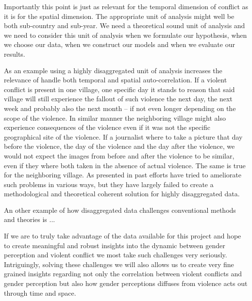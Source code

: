\documentclass[a4paper]{article}
\begin{document}
Importantly this point is just as relevant for the temporal dimension of conflict as it is for the spatial dimension. The appropriate unit of analysis might well be both sub-country and sub-year. We need a theoretical sound unit of analysis and we need to consider this unit of analysis when we formulate our hypothesis, when we choose our data, when we construct our models and when we evaluate our results.\par 

As an example using a highly disaggregated unit of analysis increases the relevance of handle both temporal and spatial auto-correlation. If a violent conflict is present in one village, one specific day it stands to reason that said village will still experience the fallout of such violence the next day, the next week and probably also the next month -- if not even longer depending on the scope of the violence. In similar manner the neighboring village might also experience consequences of the violence even if it was not the specific geographical site of the violence. If a journalist where to take a picture that day before the violence, the day of the violence and the day after the violence, we would not expect the images from before and after the violence to be similar, even if they where both taken in the absence of actual violence. The same is true for the neighboring village. As presented in \cite{SPECIALE} past efforts have tried to ameliorate such problems in various ways, but they have largely failed to create a methodological and theoretical coherent solution for highly disaggregated data.\par 

An other example of how disaggregated data challenges conventional methods and theories is ... \par

If we are to truly take advantage of the data available for this project and hope to create meaningful and robust insights into the dynamic between gender perception and violent conflict we most take such challenges very seriously. Intriguingly, solving these challenges we will also allows us to create very fine grained insights regarding not only the correlation between violent conflicts and gender perception but also how gender perceptions diffuses from violence acts out through time and space.\par


\end{document}
